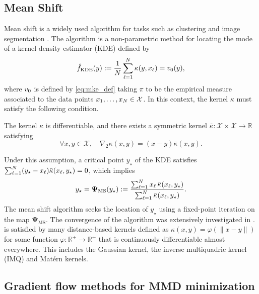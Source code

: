 \subsection{Mean Shift}\label{sec:mean_shift}
Mean shift is a widely used algorithm for tasks such as clustering \cite{FuHo75,Car15} and image segmentation \cite{CoMe02}. The algorithm is a non-parametric method for locating the mode of a kernel density estimator (KDE) defined by 
\begin{equation}
\hat{f}_{\mathrm{KDE}}(y):= \frac{1}{N} \sum\limits_{\ell=1}^{N}\kappa(y,x_{\ell}) = v_{0}(y),
\end{equation}
where $v_{0}$ is defined by \eqref{eq:mke_def} taking $\pi$ to be the empirical measure associated to the data points $x_{1}, \dots, x_{N}  \in \mathcal{X}$. In this context, the kernel $\kappa$ must satisfy the following condition. 
\begin{assumption}\label{assumption:gradient_kappa} The kernel $\kappa$ is differentiable, and there exists a symmetric kernel $\bar{\kappa}: \mathcal{X} \times \mathcal{X} \rightarrow \mathbb{R}$ satisfying
\begin{equation}\label{eq:gradient_condition_msip}
\forall x,y \in \mathcal{X}, \quad \nabla_{2}\kappa(x,y) = (x-y) \bar{\kappa}(x,y).
\end{equation}
\end{assumption}
Under this assumption, a critical point $y_{\star}$ of the KDE satisfies $\sum_{\ell=1}^N (y_{\star}-x_{\ell})\bar{\kappa}(x_{\ell},y_{\star}) = 0 $, which implies
\begin{equation}\label{eq:ms_equation}
    y_{\star} = \bm{\Psi}_{\mathrm{MS}}(y_{\star}):= \frac{\sum_{\ell=1}^N x_{\ell} \, \bar{\kappa}(x_{\ell},y_{\star})}{\sum_{\ell=1}^N \bar{\kappa}(x_{\ell},y_{\star})}.
\end{equation}
The mean shift algorithm seeks the location of $y_{\star}$ using a fixed-point iteration on the map $\bm{\Psi}_{\mathrm{MS}}$. The convergence of the algorithm was extensively investigated in \cite{Che95,LiHuWu07,Car07,Gha13,Gha15,ArMaPe16,YaTa19,YaTa24}.  is satisfied by many distance-based kernels defined as $\kappa(x,y) = \varphi(\|x-y\|)$ for some function $\varphi:\mathbb{R}^+\to\mathbb{R}^+$ that is continuously differentiable almost everywhere. This includes the Gaussian kernel, the inverse multiquadric kernel (IMQ) and Matérn kernels.

\subsection{Gradient flow methods for MMD minimization}


